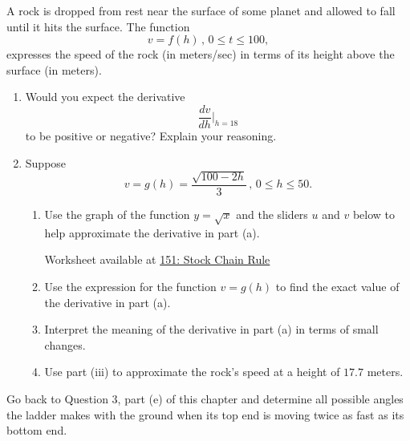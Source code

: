 \documentclass{ximera}
\begin{document}
\begin{question} \label{QLFMENEdefdes}
A rock is dropped from rest near the surface of some planet and allowed to fall until it hits the surface. The function
\[
  v = f(h) \, , \, 0\leq t \leq 100,
\]
expresses the speed of the rock (in meters/sec) in terms of its height above the surface (in meters).

\begin{enumerate}
\item Would you expect the derivative
\[
   \frac{dv}{dh}\Big|_{h=18}
\]
to be positive or negative? Explain your reasoning.

\item Suppose
\[
   v = g(h) = \frac{\sqrt{100-2h}}{3} \, , \, 0\leq h \leq 50.
\]
\begin{enumerate}

\item Use the graph of the function $y=\sqrt{x}$ and the sliders $u$ and $v$ below to help approximate the derivative in part (a).

\begin{onlineOnly}
    \begin{center}
\end{center}
\end{onlineOnly}

Worksheet available at \href{https://www.desmos.com/calculator/ilb4wptgxe}{151: Stock Chain Rule} 

\item Use the expression for the function $v=g(h)$ to find the exact value of the derivative in part (a).

\item Interpret the meaning of the derivative in part (a) in terms of small changes. 

\item Use part (iii) to approximate the rock's speed at a height of $17.7$ meters.


\end{enumerate}
\end{enumerate}

\begin{question} \label{QOERPERder}
Go back to Question 3, part (e) of this chapter and determine all possible angles the ladder makes with the ground when its top end is moving twice as fast as its bottom end.
\end{question}
\end{question}
\end{document}
